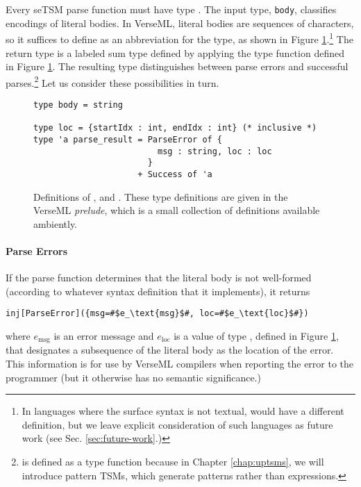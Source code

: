 Every seTSM parse function must have type . The input type, \lstinline{body}, classifies encodings of literal {bodies}. In VerseML, literal bodies are sequences of characters, so it suffices to define  as an abbreviation for the  type, as shown in Figure \ref{fig:indexrange-and-parseresult}.\footnote{In languages where the surface syntax is not textual,  would have a different definition, but we leave explicit consideration of such languages as future work (see Sec. \ref{sec:future-work}.)} The return type is a labeled sum type defined by applying the type function  defined in Figure \ref{fig:indexrange-and-parseresult}. The resulting type distinguishes between parse errors and successful parses.\footnote{ is defined as a type function because in Chapter \ref{chap:uptsms}, we will introduce pattern TSMs, which generate patterns rather than expressions.} Let us consider these possibilities in turn.
\begin{figure}
\begin{lstlisting}[numbers=none]
type body = string

type loc = {startIdx : int, endIdx : int} (* inclusive *)
type 'a parse_result = ParseError of {
                         msg : string, loc : loc
                       }
                     + Success of 'a 
\end{lstlisting}
\caption[Definitions of ,  and  in VerseML]{Definitions of ,  and . These type definitions are given in the VerseML \emph{prelude}, which is a small collection of definitions available ambiently.}
\label{fig:indexrange-and-parseresult}
\end{figure}

\paragraph{Parse Errors} If the parse function determines that the literal body is not well-formed (according to whatever syntax definition that it implements), it returns
\begin{lstlisting}[numbers=none]
inj[ParseError]({msg=#$e_\text{msg}$#, loc=#$e_\text{loc}$#})
\end{lstlisting}
where $e_\text{msg}$ is an error message and $e_\text{loc}$ is a value of type , defined in Figure \ref{fig:indexrange-and-parseresult}, that designates a subsequence of the literal body as the location of the error. This information is for use by VerseML compilers when reporting the error to the programmer (but it otherwise has no semantic significance.)%


